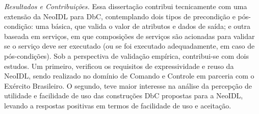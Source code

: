 \emph{Resultados e Contribuições.}
Essa dissertação contribui tecnicamente com uma extensão da NeoIDL para DbC, contemplando
dois tipos de precondição e pós-condição: uma básica, que valida o valor de
atributos e dados de saída; e outra baseada em
serviços, em que composições de serviços são acionadas para validar se o serviço
deve ser executado (ou se foi executado adequadamente, em caso de pós-condições). %
Sob a perspectiva de validação empírica, contribui-se com dois estudos.
Um primeiro, verificou
os requisitos de expressividade e reuso da NeoIDL, sendo realizado no
domínio de Comando e Controle em parceria com o Exército Brasileiro. O segundo,
teve maior interesse na análise da percepção de utilidade e facilidade de uso
das construções DbC propostas para a NeoIDL, levando a respostas positivas em
termos de facilidade de uso e aceitação.
%
%

  
\clearpage



